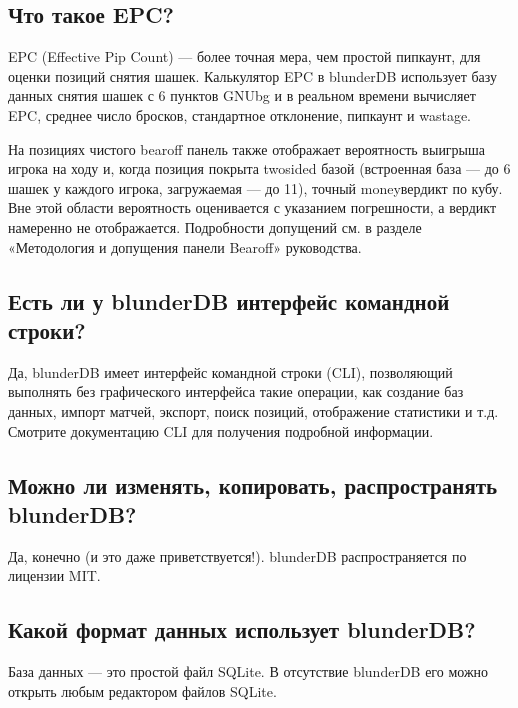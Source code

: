 \documentclass[letterpaper,10pt,russian]{sphinxmanual}
\begin{document}
\subsection{Что такое EPC?}
\label{\detokenize{faq:qu-est-ce-que-l-epc}}
\sphinxAtStartPar
EPC (Effective Pip Count) — более точная мера, чем простой пипкаунт, для оценки позиций снятия шашек. Калькулятор EPC в blunderDB использует базу данных снятия шашек с 6 пунктов GNUbg и в реальном времени вычисляет EPC, среднее число бросков, стандартное отклонение, пипкаунт и wastage.

\sphinxAtStartPar
На позициях чистого bearoff панель также отображает вероятность выигрыша игрока на ходу и, когда позиция покрыта two\sphinxhyphen{}sided базой (встроенная база — до 6 шашек у каждого игрока, загружаемая — до 11), точный money\sphinxhyphen{}вердикт по кубу. Вне этой области вероятность оценивается с указанием погрешности, а вердикт намеренно не отображается. Подробности допущений см. в разделе «Методология и допущения панели Bearoff» руководства.


\subsection{Есть ли у blunderDB интерфейс командной строки?}
\label{\detokenize{faq:blunderdb-dispose-t-il-d-une-interface-en-ligne-de-commande}}
\sphinxAtStartPar
Да, blunderDB имеет интерфейс командной строки (CLI), позволяющий выполнять без графического интерфейса такие операции, как создание баз данных, импорт матчей, экспорт, поиск позиций, отображение статистики и т.д. Смотрите документацию CLI для получения подробной информации.


\subsection{Можно ли изменять, копировать, распространять blunderDB?}
\label{\detokenize{faq:puis-je-modifier-copier-partager-blunderdb}}
\sphinxAtStartPar
Да, конечно (и это даже приветствуется!). blunderDB распространяется по лицензии MIT.


\subsection{Какой формат данных использует blunderDB?}
\label{\detokenize{faq:quel-format-de-donnees-utilise-blunderdb}}
\sphinxAtStartPar
База данных — это простой файл SQLite. В отсутствие blunderDB его можно открыть любым редактором файлов SQLite.
\end{document}
